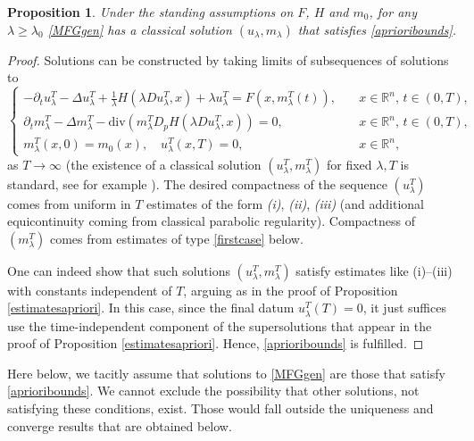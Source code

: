 \documentclass{amsart}
\newtheorem{prop}[thm]{Proposition}
\theoremstyle{remark}
\theoremstyle{definition}
\theoremstyle{Claim}
\theoremstyle{plain}
\begin{document}
\begin{prop}\label{basicest} Under the standing assumptions on $F$, $H$ and $m_0$, for any $\lambda \ge \lambda_0$ \eqref{MFGgen} has a classical solution $(u_\lambda,m_\lambda)$ that satisfies \eqref{aprioribounds}. 
\end{prop}
\begin{proof} Solutions can be constructed by taking limits of subsequences of solutions to
\begin{equation}\label{MFGgenT}
\begin{cases}
			-\partial_t u^T_\lambda-\Delta u^T_\lambda+\frac{1}{\lambda}H(\lambda Du^T_\lambda,x)+\lambda u_\lambda^T=F(x,m^T_\lambda(t)),\quad &x\in \mathbb{R}^n,\,t\in (0,T),\\
			\partial_t m^T_\lambda-\Delta m^T_\lambda-\text{div}(m^T_\lambda D_pH(\lambda Du^T_\lambda,x))=0,\quad &x\in \mathbb{R}^n,\,t\in (0,T),\\
			m^T_\lambda(x,0)=m_0(x), \quad u_\lambda^T(x,T)=0, \quad &x\in \mathbb{R}^n, %
		\end{cases}
\end{equation}
as $T \to \infty$ (the existence of a classical solution $(u_\lambda^T, m_\lambda^T)$ for fixed $\lambda, T$ is standard, see for example \cite{CP}). The desired compactness of the sequence $(u_\lambda^T)$ comes from uniform in $T$ estimates of the form \textit{(i)}, \textit{(ii)}, \textit{(iii)} (and additional equicontinuity coming from classical parabolic regularity). Compactness of $(m_\lambda^T)$ comes from estimates of type \eqref{firstcase} below.

One can indeed show that such solutions $(u^T_\lambda,m^T_\lambda)$ satisfy estimates like (i)--(iii) with constants independent of $T$,%
 arguing as in the proof of Proposition \ref{estimatesapriori}. In this case, since the final datum $u^T_\lambda(T)=0$, %
it just suffices use the time-independent component of the supersolutions that appear in the proof of Proposition \ref{estimatesapriori}. Hence, \eqref{aprioribounds} is fulfilled. 
\end{proof}
Here below, we tacitly assume that solutions to \eqref{MFGgen} are those that satisfy \eqref{aprioribounds}. We cannot exclude the possibility that other solutions, not satisfying these conditions, exist. Those would fall outside the uniqueness and converge results that are obtained below.
\end{document}
